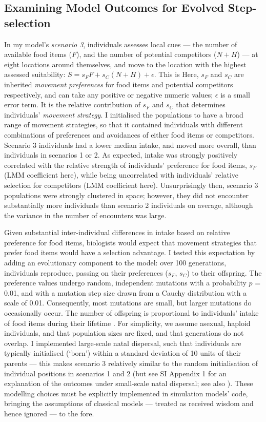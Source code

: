 \subsection*{Examining Model Outcomes for Evolved Step-selection}

In my model's \textit{scenario 3}, individuals assesses local cues --- the number of available food items ($F$), and the number of potential competitors ($N + H$) --- at eight locations around themselves, and move to the location with the highest assessed suitability: $S = s_FF + s_C(N + H) + \epsilon$.
This is 
Here, $s_F$ and $s_C$ are inherited \textit{movement preferences} for food items and potential competitors respectively, and can take any positive or negative numeric values; $\epsilon$ is a small error term.
It is the relative contribution of $s_F$ and $s_C$ that determines individuals' \textit{movement strategy}.
I initialised the populations to have a broad range of movement strategies, so that it contained individuals with different combinations of preferences and avoidances of either food items or competitors.
Scenario 3 individuals had a lower median intake, and moved more overall, than individuals in scenarios 1 or 2.
As expected, intake was strongly positively correlated with the relative strength of individuals' preference for food items, $s_F$ (LMM coefficient here), while being uncorrelated with individuals' relative selection for competitors (LMM coefficient here).
Unsurprisingly then, scenario 3 populations were strongly clustered in space; however, they did not encounter substantially more individuals than scenario 2 individuals on average, although the variance in the number of encounters was large.

Given substantial inter-individual differences in intake based on relative preference for food items, biologists would expect that movement strategies that prefer food items would have a selection advantage.
I tested this expectation by adding an evolutionary component to the model: over 100 generations, individuals reproduce, passing on their preferences ($s_F$, $s_C$) to their offspring.
The preference values undergo random, independent mutations with a probability $p$ = 0.01, and with a mutation step size drawn from a Cauchy distribution with a scale of 0.01.
Consequently, most mutations are small, but larger mutations do occasionally occur.
The number of offspring is proportional to individuals' intake of food items during their lifetime \citep{netz2021,gupte2021a,gupte2022c}.
For simplicity, we assume asexual, haploid individuals, and that population sizes are fixed, and that generations do not overlap.
I implemented large-scale natal dispersal, such that individuals are typically initialised (`born') within a standard deviation of 10 units of their parents --- this makes scenario 3 relatively similar to the random initialisation of individual positions in scenarios 1 and 2 (but see SI Appendix 1 for an explanation of the outcomes under small-scale natal dispersal; see also \cite{gupte2021a,gupte2022c}).
These modelling choices must be explicitly implemented in simulation models' code, bringing the assumptions of classical models --- treated as received wisdom and hence ignored --- to the fore.

